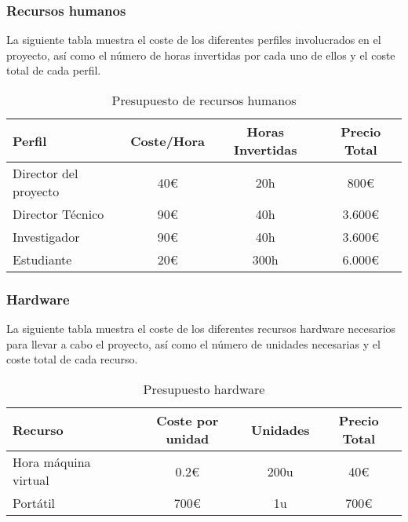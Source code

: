 \subsubsection{Recursos humanos}
La siguiente tabla muestra el coste de los diferentes perfiles involucrados en
el proyecto, así como el número de horas invertidas por cada uno de ellos y el
coste total de cada perfil.

\begin{table}[ht]
    \centering
    \begin{tabular}[ht]{l|c|c|c}
        \textbf{Perfil}       & \textbf{Coste/Hora} & \textbf{Horas Invertidas} & \textbf{Precio Total} \\
        \hline
        Director del proyecto & 40\euro             & 20h                       & 800\euro              \\
        Director Técnico      & 90\euro             & 40h                       & 3.600\euro            \\
        Investigador          & 90\euro             & 40h                       & 3.600\euro            \\
        Estudiante            & 20\euro             & 300h                      & 6.000\euro            \\
    \end{tabular}
    \caption{Presupuesto de recursos humanos}\label{tab:huma-resources}
\end{table}

\subsubsection{Hardware}
La siguiente tabla muestra el coste de los diferentes recursos hardware
necesarios para llevar a cabo el proyecto, así como el número de unidades
necesarias y el coste total de cada recurso.

\begin{table}[ht]
    \centering
    \begin{tabular}[ht]{l|c|c|c}
        \textbf{Recurso}     & \textbf{Coste por unidad} & \textbf{Unidades} & \textbf{Precio Total} \\
        \hline
        Hora máquina virtual & 0.2\euro                  & 200u              & 40\euro               \\
        Portátil             & 700\euro                  & 1u                & 700\euro              \\
    \end{tabular}
    \caption{Presupuesto hardware}
    \label{tab:hardware-budget}
\end{table}

